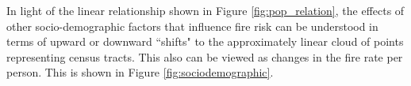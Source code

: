 \documentclass{svjour3}
\begin{document}
  In light of the linear relationship shown in Figure \ref{fig:pop_relation}, the effects of other socio-demographic factors that influence fire risk can be understood in terms of upward or downward ``shifts" to the approximately linear cloud of points representing census tracts. This also can be viewed as changes in the fire rate per person. This is shown in Figure \ref{fig:sociodemographic}.
  
  \begin{figure}[!ht]
       \begin{center}
          \\ %
\end{center}
\end{figure}
\end{document}
